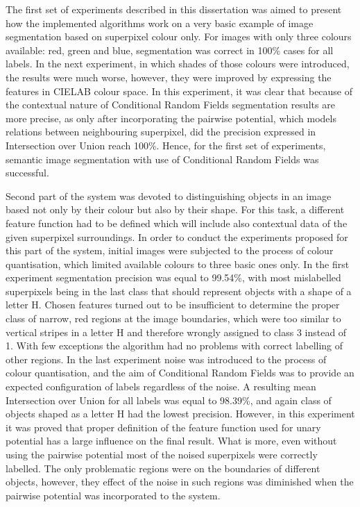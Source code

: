 The first set of experiments described in this dissertation was aimed to present how the implemented algorithms work on a very basic example of image segmentation based on superpixel colour only. For images with only three colours available: red, green and blue, segmentation was correct in 100\% cases for all labels. In the next experiment, in which shades of those colours were introduced, the results were much worse, however, they were improved by expressing the features in CIELAB colour space. In this experiment, it was clear that because of the contextual nature of Conditional Random Fields segmentation results are more precise, as only after incorporating the pairwise potential, which models relations between neighbouring superpixel, did the precision expressed in Intersection over Union reach 100\%. Hence, for the first set of experiments, semantic image segmentation with use of Conditional Random Fields was successful. 

Second part of the system was devoted to distinguishing objects in an image based not only by their colour but also by their shape. For this task, a different feature function had to be defined which will include also contextual data of the given superpixel surroundings. In order to conduct the experiments proposed for this part of the system, initial images were subjected to the process of colour quantisation, which limited available colours to three basic ones only. In the first experiment segmentation precision was equal to 99.54\%, with most mislabelled superpixels being in the last class that should represent objects with a shape of a letter H. Chosen features turned out to be insufficient to determine the proper class of narrow, red regions at the image boundaries, which were too similar to vertical stripes in a letter H and therefore wrongly assigned to class 3 instead of 1. With few exceptions the algorithm had no problems with correct labelling of other regions. In the last experiment noise was introduced to the process of colour quantisation, and the aim of Conditional Random Fields was to provide an expected configuration of labels regardless of the noise. A resulting mean Intersection over Union for all labels was equal to 98.39\%, and again class of objects shaped as a letter H had the lowest precision. However, in this experiment it was proved that proper definition of the feature function used for unary potential has a large influence on the final result. What is more, even without using the pairwise potential most of the noised superpixels were correctly labelled. The only problematic regions were on the boundaries of different objects, however, they effect of the noise in such regions was diminished when the pairwise potential was incorporated to the system.   

